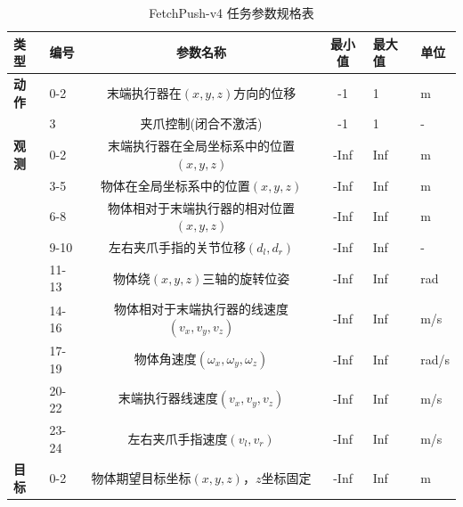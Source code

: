 \begin{table}[!htb]
  \caption{FetchPush-v4 任务参数规格表}\label{tab:fetch-push-full}
  \centering
  \small
  \begin{tabular}{@{} llccll @{}} \toprule
    \textbf{类型} & \textbf{编号} & \textbf{参数名称} & \textbf{最小值} & \textbf{最大值} & \textbf{单位} \\ \midrule
    \textbf{动作} & 0-2 & 末端执行器在$(x, y, z)$方向的位移 & -1 & 1 & m \\
    & 3 & 夹爪控制(闭合不激活) & -1 & 1 & - \\ \midrule
    \textbf{观测} & 0-2 & 末端执行器在全局坐标系中的位置$(x, y, z)$ & -Inf & Inf & m \\
    & 3-5 & 物体在全局坐标系中的位置$(x, y, z)$ & -Inf & Inf & m \\
    & 6-8 & 物体相对于末端执行器的相对位置$(x, y, z)$ & -Inf & Inf & m \\
    & 9-10 & 左右夹爪手指的关节位移$(d_l, d_r)$ & -Inf & Inf & - \\
    & 11-13 & 物体绕$(x, y, z)$三轴的旋转位姿 & -Inf & Inf & rad \\
    & 14-16 & 物体相对于末端执行器的线速度$(v_x, v_y, v_z)$ & -Inf & Inf & m/s \\
    & 17-19 & 物体角速度$(\omega_x, \omega_y, \omega_z)$ & -Inf & Inf & rad/s \\
    & 20-22 & 末端执行器线速度$(v_x, v_y, v_z)$ & -Inf & Inf & m/s \\
    & 23-24 & 左右夹爪手指速度$(v_{l}, v_{r})$  & -Inf & Inf & m/s \\ \midrule
    \textbf{目标} & 0-2 & 物体期望目标坐标$(x, y, z)$，$z$坐标固定 & -Inf & Inf & m \\ \bottomrule
  \end{tabular}
\end{table}


